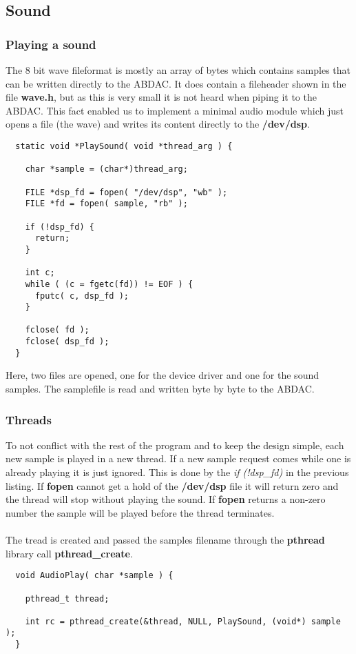 \subsection{Sound}

\subsubsection{Playing a sound}
The 8 bit wave fileformat is mostly an array of bytes which contains samples that can be written
directly to the ABDAC. It does contain a fileheader shown in the file {\bf wave.h}, but as this is very
small it is not heard when piping it to the ABDAC. This fact enabled us to implement a minimal audio
module which just opens a file (the wave) and writes its content directly to the {\bf /dev/dsp}.
\\
\begin{lstlisting}
  static void *PlaySound( void *thread_arg ) {

    char *sample = (char*)thread_arg;

    FILE *dsp_fd = fopen( "/dev/dsp", "wb" );
    FILE *fd = fopen( sample, "rb" );

    if (!dsp_fd) {
      return;
    }

    int c;
    while ( (c = fgetc(fd)) != EOF ) {
      fputc( c, dsp_fd );
    }

    fclose( fd );
    fclose( dsp_fd );
  }

\end{lstlisting}
Here, two files are opened, one for the device driver and one for the sound samples. The samplefile
is read and written byte by byte to the ABDAC.

\subsubsection{Threads}
To not conflict with the rest of the program and to keep the design simple, each new sample is
played in a new thread. If a new sample request comes while one is already playing it is just ignored.
This is done by the {\it if (!dsp\_fd)} in the previous listing. If {\bf fopen} cannot get a hold
of the {\bf /dev/dsp} file it will return zero and the thread will stop without playing the sound.
If {\bf fopen} returns a non-zero number the sample will be played before the thread terminates.\\
\\
The tread is created and passed the samples filename through the {\bf pthread} library call
{\bf pthread\_create}.
\begin{lstlisting}
  void AudioPlay( char *sample ) {

    pthread_t thread;

    int rc = pthread_create(&thread, NULL, PlaySound, (void*) sample );
  }
\end{lstlisting}
